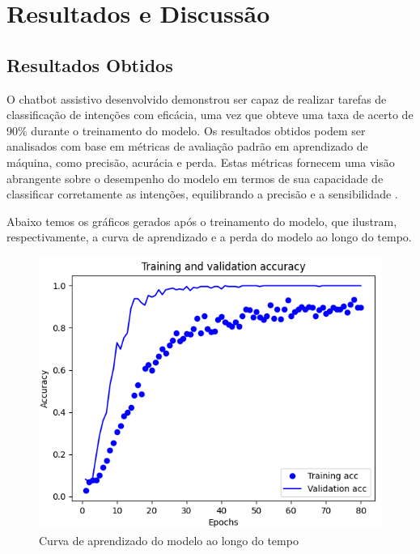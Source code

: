 \documentclass[conference]{IEEEtran}
\begin{document}


\section{Resultados e Discussão}

\subsection{Resultados Obtidos}
O chatbot assistivo desenvolvido demonstrou ser capaz de realizar tarefas de classificação de intenções com eficácia, uma vez que 
obteve uma taxa de acerto de 90\% durante o treinamento do modelo. 
Os resultados obtidos podem ser analisados com base em métricas de avaliação padrão em aprendizado de máquina, como precisão, acurácia e perda.
Estas métricas fornecem uma visão abrangente sobre o desempenho do modelo em termos de sua capacidade de classificar corretamente as intenções, 
equilibrando a precisão e a sensibilidade \cite{Sokolova2009}.

Abaixo temos os gráficos gerados após o treinamento do modelo, que ilustram, respectivamente, 
a curva de aprendizado e a perda do modelo ao longo do tempo.

\begin{figure}[htbp]
    \centerline{\includegraphics[scale=0.5]{accuracy.png}}
    \caption{Curva de aprendizado do modelo ao longo do tempo}
    \label{fig3}
\end{figure}
\end{document}
